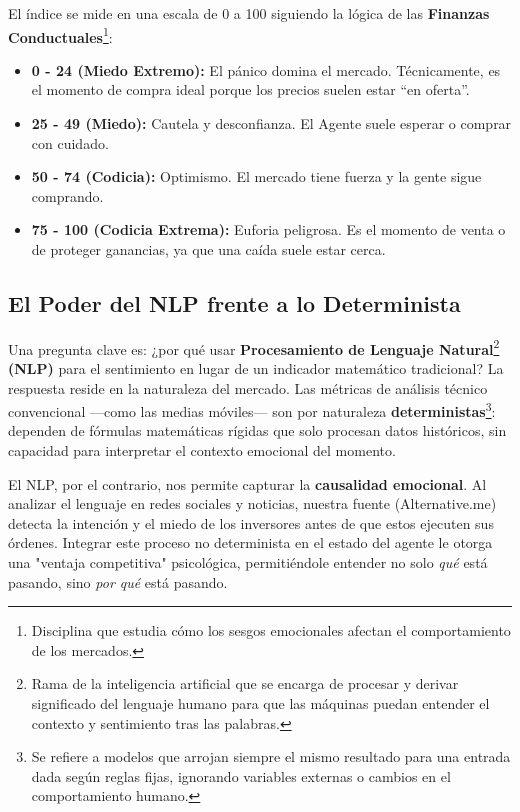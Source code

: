 \documentclass[12pt,a4paper]{article}
\begin{document}
El índice se mide en una escala de 0 a 100 siguiendo la lógica de las \textbf{Finanzas Conductuales}\footnote{Disciplina que estudia cómo los sesgos emocionales afectan el comportamiento de los mercados.}:
\begin{itemize}
    \item \textbf{0 - 24 (Miedo Extremo):} El pánico domina el mercado. Técnicamente, es el momento de compra ideal porque los precios suelen estar ``en oferta''.
    \item \textbf{25 - 49 (Miedo):} Cautela y desconfianza. El Agente suele esperar o comprar con cuidado.
    \item \textbf{50 - 74 (Codicia):} Optimismo. El mercado tiene fuerza y la gente sigue comprando.
\item \textbf{75 - 100 (Codicia Extrema):} Euforia peligrosa. Es el momento de venta o de proteger ganancias, ya que una caída suele estar cerca.
\end{itemize}

\subsection{El Poder del NLP frente a lo Determinista}

Una pregunta clave es: ¿por qué usar \textbf{Procesamiento de Lenguaje Natural}\footnote{Rama de la inteligencia artificial que se encarga de procesar y derivar significado del lenguaje humano para que las máquinas puedan entender el contexto y sentimiento tras las palabras.} \textbf{(NLP)} para el sentimiento en lugar de un indicador matemático tradicional? La respuesta reside en la naturaleza del mercado. Las métricas de análisis técnico convencional ---como las medias móviles--- son por naturaleza \textbf{deterministas}\footnote{Se refiere a modelos que arrojan siempre el mismo resultado para una entrada dada según reglas fijas, ignorando variables externas o cambios en el comportamiento humano.}: dependen de fórmulas matemáticas rígidas que solo procesan datos históricos, sin capacidad para interpretar el contexto emocional del momento.

El NLP, por el contrario, nos permite capturar la \textbf{causalidad emocional}. Al analizar el lenguaje en redes sociales y noticias, nuestra fuente (Alternative.me) detecta la intención y el miedo de los inversores antes de que estos ejecuten sus órdenes. Integrar este proceso no determinista en el estado del agente le otorga una "ventaja competitiva" psicológica, permitiéndole entender no solo \textit{qué} está pasando, sino \textit{por qué} está pasando.
\end{document}
